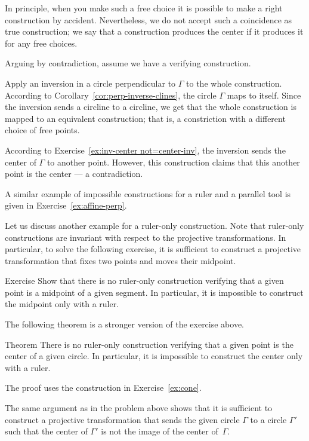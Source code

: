 In principle, when you make such a free choice it is possible to make a right construction by accident.
Nevertheless, we do not accept such a coincidence as true construction; 
we say that a construction produces the center if it produces it for any free choices.


\label{page:solution-for-ex:circumtool}
Arguing by contradiction, 
assume we have a verifying construction. 

Apply an inversion in a circle perpendicular to $\Gamma$ to the whole construction.
According to Corollary~\ref{cor:perp-inverse-clines},
the circle
$\Gamma$ maps to itself.
Since the inversion sends a circline to a circline, we get that the whole  construction is mapped to an equivalent construction; 
that is, a constriction with a different choice of free points.

According to Exercise~\ref{ex:inv-center not=center-inv}, 
the inversion sends the center of $\Gamma$ to another point.
However, this construction claims that this another point is the center --- a contradiction.
\qeds

A similar example of impossible constructions for a ruler and a parallel tool
 is given in Exercise~\ref{ex:affine-perp}.
 
Let us discuss another example for a ruler-only construction.
Note that ruler-only constructions are invariant with respect to the projective transformations. 
In particular, to solve the following exercise, it is sufficient to construct a projective transformation that fixes two points and moves their midpoint.

\begin{thm}{Exercise}\label{ex:midpoint-proj}
Show that there is no ruler-only construction verifying that a given point is a  midpoint of a given segment.
In particular, it is impossible to construct the midpoint only with a ruler.
\end{thm}

The following theorem is a stronger version of the exercise above.

\begin{thm}{Theorem}\label{thm:circle-center-proj}
There is no ruler-only construction verifying that a given point is the center of a given circle.
In particular, it is impossible to construct the center only with a ruler.
\end{thm}

The proof uses the construction in Exercise~\ref{ex:cone}.

The same argument as in the problem above shows that 
it is sufficient to construct a projective transformation 
that sends the given circle $\Gamma$ to a circle $\Gamma'$ such that the center of $\Gamma'$ is not the image of the center of~$\Gamma$.


